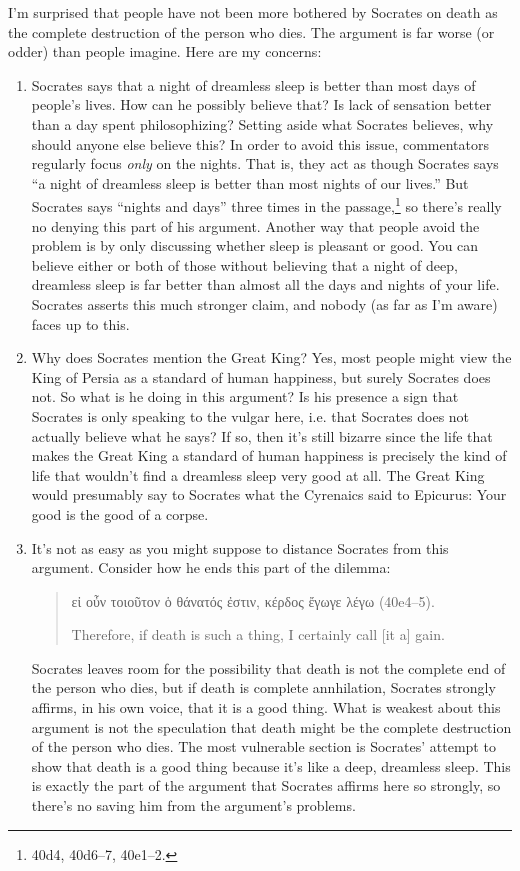\documentclass[11pt]{article}
\begin{document}
I'm surprised that people have not been more bothered by Socrates on death as the complete destruction of the person who dies.  The argument is far worse (or odder) than people imagine.  Here are my concerns:

\begin{enumerate}

    \item Socrates says that a night of dreamless sleep is better than most days of people's lives.  How can he possibly believe that?  Is lack of sensation better than a day spent philosophizing?  Setting aside what Socrates believes, why should anyone else believe this?  In order to avoid this issue, commentators regularly focus \emph{only} on the nights.  That is, they act as though Socrates says ``a night of dreamless sleep is better than most nights of our lives.'' But Socrates says ``nights and days'' three times in the passage,\footnote{40d4, 40d6--7, 40e1--2.} so there's really no denying this part of his argument.  Another way that people avoid the problem is by only discussing whether sleep is pleasant or good.  You can believe either or both of those without believing that a night of deep, dreamless sleep is far better than almost all the days and nights of your life.  Socrates asserts this much stronger claim, and nobody (as far as I'm aware) faces up to this.

    \item Why does Socrates mention the Great King?  Yes, most people might view the King of Persia as a standard of human happiness, but surely Socrates does not.  So what is he doing in this argument?  Is his presence a sign that Socrates is only speaking to the vulgar here, i.e.  that Socrates does not actually believe what he says?  If so, then it's still bizarre since the life that makes the Great King a standard of human happiness is precisely the kind of life that wouldn't find a dreamless sleep very good at all.  The Great King would presumably say to Socrates what the Cyrenaics said to Epicurus: Your good is the good of a corpse.  

    \item It's not as easy as you might suppose to distance Socrates from this argument.  Consider how he ends this part of the dilemma:
        \begin{quote}
            {\g
            εἰ οὖν τοιοῦτον ὁ θάνατός ἐστιν, κέρδος ἔγωγε λέγω
            } (40e4--5).

            Therefore, if death is such a thing, I certainly call [it a] gain.
        \end{quote}
        Socrates leaves room for the possibility that death is not the complete end of the person who dies, but if death is complete annhilation, Socrates strongly affirms, in his own voice, that it is a good thing.  What is weakest about this argument is not the speculation that death might be the complete destruction of the person who dies.  The most vulnerable section is Socrates' attempt to show that death is a good thing because it's like a deep, dreamless sleep.  This is exactly the part of the argument that Socrates affirms here so strongly, so there's no saving him from the argument's problems.


\end{enumerate}
\end{document}
